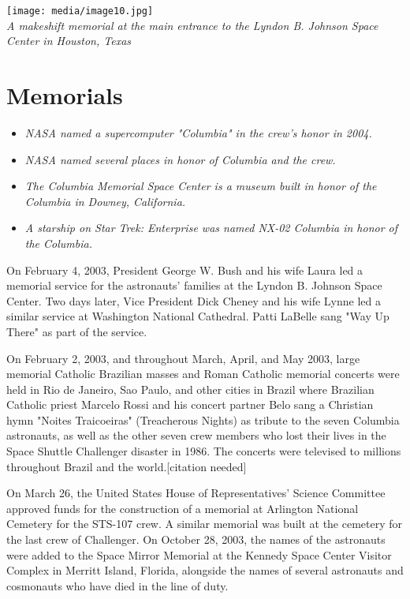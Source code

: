 \texttt{[image: media/image10.jpg]}\\
\emph{A makeshift memorial at the main entrance to the Lyndon B. Johnson
Space Center in Houston, Texas}

\section{Memorials}\label{memorials}

\begin{itemize}
\item
  \emph{NASA named a supercomputer "Columbia" in the crew's honor in
  2004.}
\item
  \emph{NASA named several places in honor of Columbia and the crew.}
\item
  \emph{The Columbia Memorial Space Center is a museum built in honor of
  the Columbia in Downey, California.}
\item
  \emph{A starship on Star Trek: Enterprise was named NX-02 Columbia in
  honor of the Columbia.}
\end{itemize}

On February 4, 2003, President George W. Bush and his wife Laura led a
memorial service for the astronauts' families at the Lyndon B. Johnson
Space Center. Two days later, Vice President Dick Cheney and his wife
Lynne led a similar service at Washington National Cathedral. Patti
LaBelle sang "Way Up There" as part of the service.

On February 2, 2003, and throughout March, April, and May 2003, large
memorial Catholic Brazilian masses and Roman Catholic memorial concerts
were held in Rio de Janeiro, Sao Paulo, and other cities in Brazil where
Brazilian Catholic priest Marcelo Rossi and his concert partner Belo
sang a Christian hymn "Noites Traicoeiras" (Treacherous Nights) as
tribute to the seven Columbia astronauts, as well as the other seven
crew members who lost their lives in the Space Shuttle Challenger
disaster in 1986. The concerts were televised to millions throughout
Brazil and the world.{[}citation needed{]}

On March 26, the United States House of Representatives' Science
Committee approved funds for the construction of a memorial at Arlington
National Cemetery for the STS-107 crew. A similar memorial was built at
the cemetery for the last crew of Challenger. On October 28, 2003, the
names of the astronauts were added to the Space Mirror Memorial at the
Kennedy Space Center Visitor Complex in Merritt Island, Florida,
alongside the names of several astronauts and cosmonauts who have died
in the line of duty.

